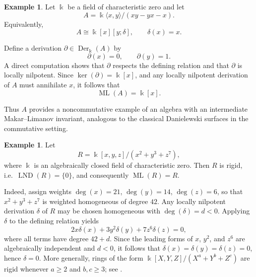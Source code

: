 \documentclass{amsart}
\theoremstyle{plain}
\numberwithin{theorem}{section}
\numberwithin{equation}{theorem}
\theoremstyle{definition}
\newtheorem{example}[theorem]{Example}
\DeclareMathOperator{\LND}{LND}
\DeclareMathOperator{\ML}{ML}
\DeclareMathOperator{\Der}{Der}
\begin{document}
\begin{example}
\label{ex:lie}
Let $\Bbbk$ be a field of characteristic zero and let
\[
A=\Bbbk\langle x,y\rangle /(xy-yx-x).
\]
Equivalently,
\[
A \cong \Bbbk[x][y;\delta],
\qquad \delta(x)=x.
\]

Define a derivation $\partial\in\Der_\Bbbk(A)$ by
\[
\partial(x)=0, \qquad \partial(y)=1.
\]
A direct computation shows that $\partial$ respects the defining relation and
that $\partial$ is locally nilpotent. 
Since $\ker(\partial)=\Bbbk[x]$, and any locally nilpotent derivation of $A$
must annihilate $x$, it follows that
\[
\ML(A)=\Bbbk[x].
\]

Thus $A$ provides a noncommutative example of an algebra with an intermediate
Makar--Limanov invariant, analogous to the classical Danielewski surfaces in
the commutative setting.
\end{example}


\begin{example}\label{ex:rigid-surface-concise}
Let
\[
R=\Bbbk[x,y,z]/(x^{2}+y^{3}+z^{7}),
\]
where $\Bbbk$ is an algebraically closed field of characteristic zero.
Then $R$ is rigid, i.e.\ $\LND(R)=\{0\}$, and consequently $\ML(R)=R$.

Indeed, assign weights $\deg(x)=21$, $\deg(y)=14$, $\deg(z)=6$, so that
$x^{2}+y^{3}+z^{7}$ is weighted homogeneous of degree $42$.
Any locally nilpotent derivation $\delta$ of $R$ may be chosen homogeneous with
$\deg(\delta)=d<0$.
Applying $\delta$ to the defining relation yields
\[
2x\delta(x)+3y^{2}\delta(y)+7z^{6}\delta(z)=0,
\]
where all terms have degree $42+d$.
Since the leading forms of $x$, $y^{2}$, and $z^{6}$ are algebraically independent
and $d<0$, it follows that
$\delta(x)=\delta(y)=\delta(z)=0$, hence $\delta=0$. More generally, rings of the form
$\Bbbk[X,Y,Z]/(X^{a}+Y^{b}+Z^{c})$ are rigid whenever $a\ge 2$ and $b,c\ge 3$;
see \cite[Theorem~7.2]{CrachiolaMaubach}.
\end{example}












\end{document}
